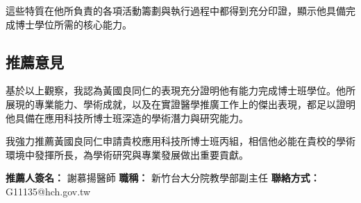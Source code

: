 \documentclass[12pt,a4paper]{article}
\begin{document}
這些特質在他所負責的各項活動籌劃與執行過程中都得到充分印證，顯示他具備完成博士學位所需的核心能力。

\subsection*{推薦意見}

基於以上觀察，我認為黃國良同仁的表現充分證明他有能力完成博士班學位。他所展現的專業能力、學術成就，以及在實證醫學推廣工作上的傑出表現，都足以證明他具備在應用科技所博士班深造的學術潛力與研究能力。

我強力推薦黃國良同仁申請貴校應用科技所博士班丙組，相信他必能在貴校的學術環境中發揮所長，為學術研究與專業發展做出重要貢獻。

\vspace{1cm}

\textbf{推薦人簽名：} 謝慕揚醫師 \hspace{1cm} \textbf{職稱：} 新竹台大分院教學部副主任 \hspace{1cm} \textbf{聯絡方式：} G11135@hch.gov.tw
\end{document}
